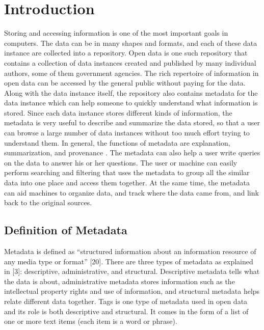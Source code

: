 
\chapter{Introduction}
\label{ch:Introduction}

Storing and accessing information is one of the most important goals in computers. The data can be in many shapes and formats, and each of these  \acf{data instance} are collected into a repository. Open data is one such repository that contains a collection of data instances created and published by many individual authors, some of them government agencies. The rich repertoire of information in open data can be accessed by the general public without paying for the data. Along with the data instance itself, the repository also contains metadata for the data instance which can help someone to quickly understand what information is stored. Since each data instance stores different kinds of information, the metadata is very useful to describe and summarize the data stored, so that a user can browse a large number of data instances without too much effort trying to understand them. In general, the functions of metadata are explanation, summarization, and provenance \cite{10.1145/2845915}. The metadata can also help a user write queries on the data to answer his or her questions. The user or machine can easily perform searching and filtering that uses the metadata to group all the similar data into one place and access them together. At the same time, the metadata can aid machines to organize data, and track where the data came from, and link back to the original sources.

\section{Definition of Metadata}
\label{sec:DefinitionOfMetadata}

Metadata is defined as “structured information about an information resource of any media type or format” \cite{Feltner2023Metadata}[20]. There are three types of metadata as explained in \cite{Baca2008}[3]: descriptive, administrative, and structural. Descriptive metadata tells what the data is about, administrative metadata stores information such as the intellectual property rights and use of information, and
structural metadata helps relate different data together. Tags is one type of metadata used in open data and its role is both descriptive and structural. It comes in the form of a list of one or more text items (each item is a word or phrase).

